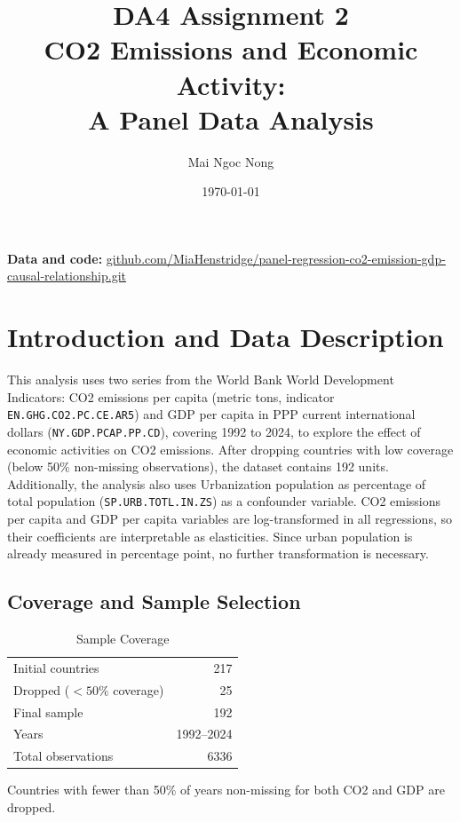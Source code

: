 \documentclass[12pt, a4paper]{article}
\title{
    \vspace{-1cm}
    {\large DA4 Assignment 2} \\[0.4em]
    {\LARGE \textbf{CO2 Emissions and Economic Activity: \\A Panel Data Analysis}}
}
\author{Mai Ngoc Nong}
\date{\today}
\begin{document}

\maketitle
\thispagestyle{empty}

\vspace{1em}
\noindent\textbf{Data and code:} \href{https://github.com/MiaHenstridge/panel-regression-co2-emission-gdp-causal-relationship.git}{github.com/MiaHenstridge/panel-regression-co2-emission-gdp-causal-relationship.git}


\section{Introduction and Data Description}

This analysis uses two series from the World Bank World Development Indicators: CO2 emissions per capita (metric tons, indicator \texttt{EN.GHG.CO2.PC.CE.AR5}) and GDP per capita in PPP current international dollars (\texttt{NY.GDP.PCAP.PP.CD}), covering 1992 to 2024, to explore the effect of economic activities on CO2 emissions. After dropping countries with low coverage (below 50\% non-missing observations), the dataset contains 192 units. Additionally, the analysis also uses Urbanization population as percentage of total population (\texttt{SP.URB.TOTL.IN.ZS}) as a confounder variable. CO2 emissions per capita and GDP per capita variables are log-transformed in all regressions, so their coefficients are interpretable as elasticities. Since urban population is already measured in percentage point, no further transformation is necessary.

\subsection{Coverage and Sample Selection}

\begin{table}[H]
\centering
\begin{threeparttable}
\caption{Sample Coverage}
\label{tab:coverage}
\begin{tabularx}{0.6\textwidth}{Xr}
\toprule
Initial countries   & 217 \\
Dropped ($< 50\%$ coverage) & 25 \\
Final sample        & 192 \\
Years               & 1992--2024 \\
Total observations  & 6336 \\
\bottomrule
\end{tabularx}
\begin{tablenotes}
\small
\item Countries with fewer than 50\% of years non-missing for both CO2 and GDP are dropped.
\end{tablenotes}
\end{threeparttable}
\end{table}
\end{document}

